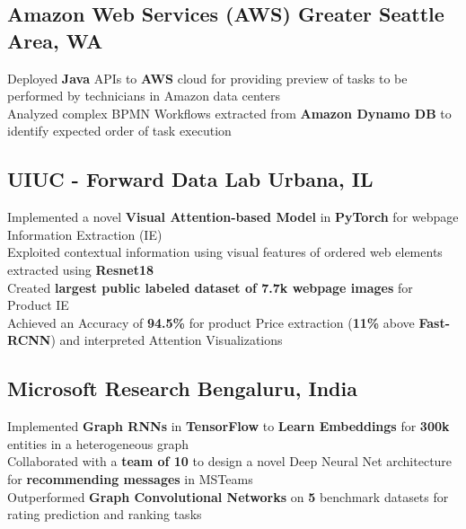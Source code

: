\documentclass[]{Keval-resume}
\begin{document}
\subsection{Amazon Web Services (AWS) \hfill \normalfont G\lowercase{reater} S\lowercase{eattle} A\lowercase{rea}, WA}
\textbullet{} Deployed \textbf{Java} APIs to \textbf{AWS} cloud for providing preview of tasks to be performed by technicians in Amazon data centers \\
\textbullet{} Analyzed complex BPMN Workflows extracted from \textbf{Amazon Dynamo DB} to identify expected order of task execution \\
\sectionsep

\subsection{UIUC - Forward Data Lab \hfill \normalfont U\lowercase{rbana}, IL}
\textbullet{} Implemented a novel \textbf{Visual Attention-based Model} in \textbf{PyTorch} for webpage Information Extraction (IE) \\
\textbullet{} Exploited contextual information using visual features of ordered web elements extracted using \textbf{Resnet18} \\  
\textbullet{} Created \textbf{largest public labeled dataset of 7.7k webpage images} for Product IE \\
\textbullet{} Achieved an Accuracy of \textbf{94.5\%} for product Price extraction (\textbf{11\%} above \textbf{Fast-RCNN}) and interpreted Attention Visualizations
\sectionsep

\subsection{Microsoft Research \hfill \normalfont B\lowercase{engaluru}, I\lowercase{ndia}}
\textbullet{} Implemented \textbf{Graph RNNs} in \textbf{TensorFlow} to \textbf{Learn Embeddings} for \textbf{300k} entities in a heterogeneous graph \\
\textbullet{} Collaborated with a \textbf{team of 10} to design a novel Deep Neural Net architecture for \textbf{recommending messages} in MSTeams \\
\textbullet{} Outperformed \textbf{Graph Convolutional Networks} on \textbf{5} benchmark datasets for rating prediction and ranking tasks
\sectionsep
\end{document}
